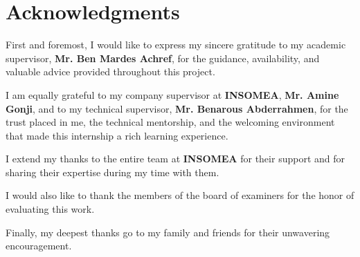 \chapter*{Acknowledgments}
\thispagestyle{empty}

\vspace*{1cm}

First and foremost, I would like to express my sincere gratitude to my academic
supervisor, \textbf{Mr. Ben Mardes Achref}, for the guidance, availability, and
valuable advice provided throughout this project.

\vspace{0.4cm}
I am equally grateful to my company supervisor at \textbf{INSOMEA},
\textbf{Mr. Amine Gonji}, and to my technical supervisor,
\textbf{Mr. Benarous Abderrahmen}, for the trust placed in me, the technical
mentorship, and the welcoming environment that made this internship a rich
learning experience.

\vspace{0.4cm}
I extend my thanks to the entire team at \textbf{INSOMEA} for their support and
for sharing their expertise during my time with them.

\vspace{0.4cm}
I would also like to thank the members of the board of examiners for the honor
of evaluating this work.

\vspace{0.4cm}
Finally, my deepest thanks go to my family and friends for their unwavering
encouragement.
